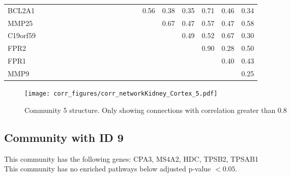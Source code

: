 \begin{longtable}{lrrrrrrrrrrrrrrrrrrrr}
BCL2A1   &             &              &               &              &              &            &             &             &             &             &            &            &            &              &        0.56 &           0.38 &       0.35 &       0.71 &       0.46 &           0.34 \\
MMP25    &             &              &               &              &              &            &             &             &             &             &            &            &            &              &             &           0.67 &       0.47 &       0.57 &       0.47 &           0.58 \\
C19orf59 &             &              &               &              &              &            &             &             &             &             &            &            &            &              &             &                &       0.49 &       0.52 &       0.67 &           0.30 \\
FPR2     &             &              &               &              &              &            &             &             &             &             &            &            &            &              &             &                &            &       0.90 &       0.28 &           0.50 \\
FPR1     &             &              &               &              &              &            &             &             &             &             &            &            &            &              &             &                &            &            &       0.40 &           0.43 \\
MMP9     &             &              &               &              &              &            &             &             &             &             &            &            &            &              &             &                &            &            &            &           0.25 \\
\end{longtable}


\begin{figure}[h!]
\centering
\texttt{[image: corr\_figures/corr\_networkKidney\_Cortex\_5.pdf]}
\caption{Community 5 structure. Only showing connections with correlation greater than 0.8}
\end{figure}




\subsection*{Community with ID 9}
This community has the following genes: CPA3, MS4A2, HDC, TPSB2, TPSAB1
\\
This community has no enriched pathways below adjusted p-value $< 0.05$.

